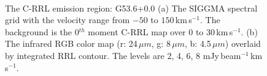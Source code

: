 \documentclass[manuscript]{aastex61}
\newcommand{\kms}{\,km\,s$^{-1}$}
\newcommand{\um}{\mu m}
\begin{document}
\begin{figure}[H]
	\centering
	\\
	\caption{The C-RRL emission region: G53.6+0.0
	(a) The SIGGMA spectral grid with the velocity range from $-50$ to $150$\kms.
	The background is the 0$^{th}$ moment C-RRL map over $0$ to $30$\kms.
	(b) The infrared RGB color map (r: 24\,$\um$, g: 8\,$\um$, b: 4.5\,$\um$) overlaid by integrated RRL contour.
	The levels are 2, 4, 6, 8 mJy\,beam$^{-1}$\kms.}
	\label{fig_crrl-g536}
\end{figure}
\end{document}
